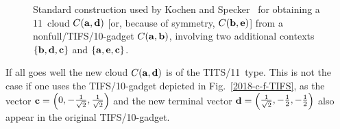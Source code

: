 \documentclass[%
  reprint,
  twocolumn,
 showpacs,
 showkeys,
 preprintnumbers,
 amsmath,amssymb,
 aps,
  prl,
  longbibliography,
 ]{revtex4-1}
\begin{document}
\begin{figure}
\begin{center}
\end{center}
\caption{
\label{2018-c-fcloud10-11}
Standard construction used by Kochen and Specker~\cite[Lemma~1, $\Gamma_1$, p.~68]{kochen1}
for obtaining a 11~cloud $C({\bf a},{\bf d})$ [or, because of symmetry, $C({\bf b},{\bf e})$]
from a nonfull/TIFS/10-gadget $C({\bf a},{\bf b})$,
involving two additional contexts $\left\{ {\bf b},{\bf d},{\bf c} \right\}$
and $\left\{ {\bf a},{\bf e} ,{\bf c}  \right\}$.}
\end{figure}
If all goes well the new cloud $C({\bf a},{\bf d})$ is of the TITS/11~type.
This is not the case if one uses the TIFS/10-gadget depicted in Fig.~\ref{2018-c-f-TIFS},
as the vector
 ${\bf c} =
\begin{pmatrix}
0,
-\frac{1}{\sqrt{2}},
\frac{1}{\sqrt{2}}
\end{pmatrix}$
and the new terminal vector ${\bf d} =\begin{pmatrix}
 \frac{1}{\sqrt{2}},-\frac{1}{2},-\frac{1}{2}
\end{pmatrix}$
also appear in the original TIFS/10-gadget.
\end{document}
